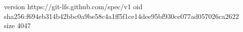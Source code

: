 version https://git-lfs.github.com/spec/v1
oid sha256:f694eb314b42bbc0a9be58c4a1ff5f1ce14dee95bf930ce077ad057026ca2622
size 4047
